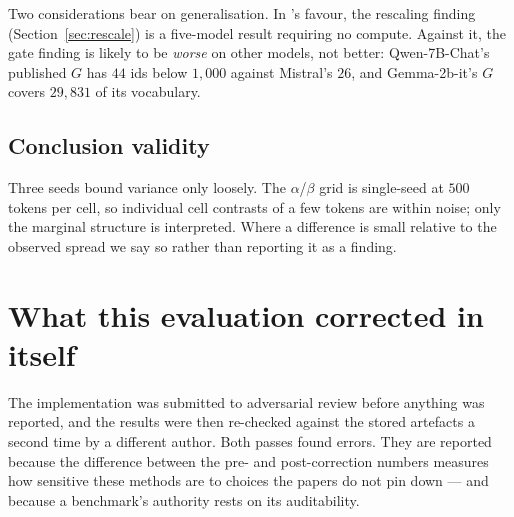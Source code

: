 Two considerations bear on generalisation. In \gc{}'s favour, the rescaling
finding (Section~\ref{sec:rescale}) is a five-model result requiring no compute.
Against it, the gate finding is likely to be \emph{worse} on other models, not
better: Qwen-7B-Chat's published $G$ has $44$ ids below $1{,}000$ against
Mistral's $26$, and Gemma-2b-it's $G$ covers $29{,}831$ of its vocabulary.

\subsection{Conclusion validity}

Three seeds bound variance only loosely. The $\alpha$/$\beta$ grid is single-seed
at $500$ tokens per cell, so individual cell contrasts of a few tokens are within
noise; only the marginal structure is interpreted. Where a difference is small
relative to the observed spread we say so rather than reporting it as a finding.

\section{What this evaluation corrected in itself}
\label{sec:selfcorrection}

The implementation was submitted to adversarial review before anything was
reported, and the results were then re-checked against the stored artefacts a
second time by a different author. Both passes found errors. They are reported
because the difference between the pre- and post-correction numbers measures how
sensitive these methods are to choices the papers do not pin down --- and because
a benchmark's authority rests on its auditability.

